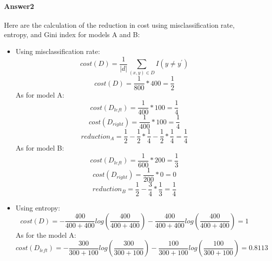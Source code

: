 \documentclass[paper=a4, fontsize=11pt]{scrartcl} %
\numberwithin{equation}{section} %
\numberwithin{figure}{section} %
\numberwithin{table}{section} %
\begin{document}
\paragraph{\textbf{Answer2}}
Here are the calculation of the reduction in cost using misclassification rate, entropy, and Gini index for models A and B:
\begin{itemize}
	\item Using misclassification rate:
		\begin{equation*}
		cost\left ( D \right )=\frac{1}{\left | d \right |}\sum_{\left ( x,y \right )\in D}I\left ( y\neq y^{'} \right )
		\end{equation*}
		\begin{equation*}
		cost\left ( D \right )=\frac{1}{800}*400=\frac{1}{2}
		\end{equation*}
		As for model A:
		\begin{equation*}
		cost\left ( D_{left} \right )=\frac{1}{400}*100=\frac{1}{4}
		\end{equation*}
		\begin{equation*}
		cost\left ( D_{right} \right )=\frac{1}{400}*100=\frac{1}{4}
		\end{equation*}
		\begin{equation*}
		reduction_{A}=\frac{1}{2}-\frac{1}{2}*\frac{1}{4}-\frac{1}{2}*\frac{1}{4}=\frac{1}{4}
		\end{equation*}
		As for model B:
		\begin{equation*}
		cost\left ( D_{left} \right )=\frac{1}{600}*200=\frac{1}{3}
		\end{equation*}
		\begin{equation*}
		cost\left ( D_{right} \right )=\frac{1}{200}*0=0
		\end{equation*}
		\begin{equation*}
		reduction_{B}=\frac{1}{2}-\frac{3}{4}*\frac{1}{3}=\frac{1}{4}
		\end{equation*}
	\item Using entropy:
		\begin{equation*}
		cost\left ( D \right )=-\frac{400}{400+400}log\left ( \frac{400}{400+400} \right )-\frac{400}{400+400}log\left ( \frac{400}{400+400} \right )=1
		\end{equation*}
		As for the model A:
		\begin{equation*}
		cost\left ( D_{left} \right )=-\frac{300}{300+100}log\left ( \frac{300}{300+100} \right )-\frac{100}{300+100}log\left ( \frac{100}{300+100} \right )=0.8113
		\end{equation*}

\end{itemize}
\end{document}
